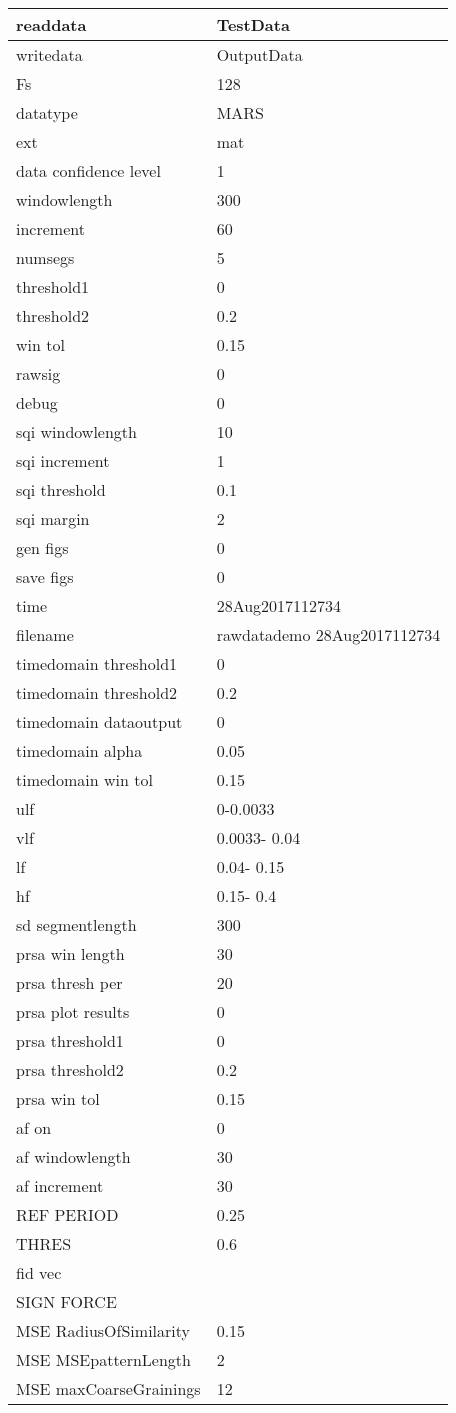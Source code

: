 \begin{tabular}{|l|l|}
\hline
readdata&TestData\\\hline
writedata&OutputData\\\hline
Fs&128\\\hline
datatype&MARS\\\hline
ext&mat\\\hline
data confidence level&1\\\hline
windowlength&300\\\hline
increment&60\\\hline
numsegs&5\\\hline
threshold1&0\\\hline
threshold2&0.2\\\hline
win tol&0.15\\\hline
rawsig&0\\\hline
debug&0\\\hline
sqi windowlength&10\\\hline
sqi increment&1\\\hline
sqi threshold&0.1\\\hline
sqi margin&2\\\hline
gen figs&0\\\hline
save figs&0\\\hline
time&28Aug2017112734\\\hline
filename&rawdatademo 28Aug2017112734\\\hline
timedomain threshold1&0\\\hline
timedomain threshold2&0.2\\\hline
timedomain dataoutput&0\\\hline
timedomain alpha&0.05\\\hline
timedomain win tol&0.15\\\hline
ulf&     0-0.0033\\\hline
vlf&0.0033-  0.04\\\hline
lf&  0.04-  0.15\\\hline
hf&  0.15-   0.4\\\hline
sd segmentlength&300\\\hline
prsa win length&30\\\hline
prsa thresh per&20\\\hline
prsa plot results&0\\\hline
prsa threshold1&0\\\hline
prsa threshold2&0.2\\\hline
prsa win tol&0.15\\\hline
af on&0\\\hline
af windowlength&30\\\hline
af increment&30\\\hline
REF PERIOD&0.25\\\hline
THRES&0.6\\\hline
fid vec&\\\hline
SIGN FORCE&\\\hline
MSE RadiusOfSimilarity&0.15\\\hline
MSE MSEpatternLength&2\\\hline
MSE maxCoarseGrainings&12\\\hline
\end{tabular}
